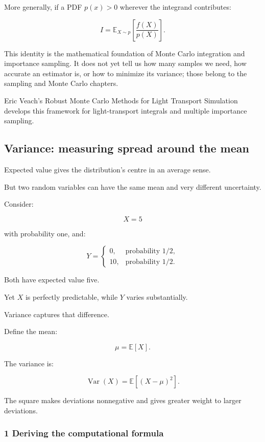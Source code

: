 More generally, if a PDF \(p(x)>0\) wherever the integrand contributes:

\[
 \boxed{ I= \mathbb E_{X\sim p} \left[ \frac{f(X)}{p(X)} \right] }.
\]

This identity is the mathematical foundation of Monte Carlo integration and importance sampling. It does not yet tell us how many samples we need, how accurate an estimator is, or how to minimize its variance; those belong to the sampling and Monte Carlo chapters.

Eric Veach's Robust Monte Carlo Methods for Light Transport Simulation develops this framework for light-transport integrals and multiple importance sampling.

\subsection{Variance: measuring spread around the mean}\label{02-foundations-ii-ch023-variance-measuring-spread-around-the-mean}

\hypertarget{02-foundations-ii-ch023-variance-measuring-spread-around-the-mean}{}

Expected value gives the distribution's centre in an average sense.

But two random variables can have the same mean and very different uncertainty.

Consider:

\[
 X=5
\]

with probability one, and:

\[
 Y= \begin{cases} 0,&\text{probability }1/2,\\ 10,&\text{probability }1/2. \end{cases}
\]

Both have expected value five.

Yet \(X\) is perfectly predictable, while \(Y\) varies substantially.

Variance captures that difference.

Define the mean:

\[
 \mu=\mathbb E[X].
\]

The variance is:

\[
 \boxed{ \operatorname{Var}(X)= \mathbb E[(X-\mu)^2] }.
\]

The square makes deviations nonnegative and gives greater weight to larger deviations.

\subsubsection{1 Deriving the computational formula}\label{02-foundations-ii-ch023-deriving-the-computational-formula}

